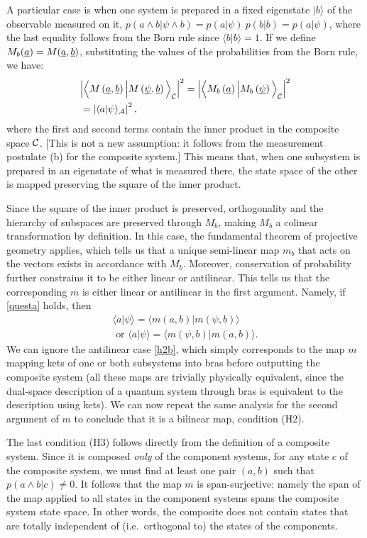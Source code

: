\documentclass[aps,prl,amsmath,amssymb,twocolumn,nofootinbib]{revtex4}
\theoremstyle{plain}
\theoremstyle{definition}
\theoremstyle{remark}
\newcommand{\pj}[1] {\underbar{$#1$}}
\def\>{\rangle}
\def\<{\langle}
\def\labell#1{\label{#1}}
\begin{document}
A particular case is when one system is
prepared in a fixed eigenstate $|b\>$ of the observable measured on it,
$p(a\wedge b|\psi\wedge b)=p(a|\psi)\:p(b|b)=p(a|\psi)$, where the last equality follows from the Born rule since $\<b|b\>=1$. 
  If we define $M_b(\pj{a}) = M(\pj{a},\pj{b})$, substituting the values of the
probabilities from the Born rule, we have:
\begin{align} &\Big|\Big\<M\left(\pj{a},\pj{b}\right)\Big|M\left(\pj{\psi},\pj{b}\right)\Big\>_{\cal C}\Big|^2
  =\Big|\Big\<M_b\left(\pj{a}\right)\Big|M_b\left(\pj{\psi}\right)\Big\>_{\cal C}\Big|^2
\nonumber \\&
=\left|\<a|\psi\>_{\cal A}\right|^2
\labell{questa},
\end{align}
where the first and second terms contain the inner product in the composite
space $\cal C$. [This is not a new assumption: it follows from the
measurement postulate (b) for the composite system.] This means that,
when one subsystem is prepared in an eigenstate of what is measured
there, the state space of the other is mapped preserving the square of
the inner product.

Since the square of the inner product is preserved, orthogonality and
the hierarchy of subspaces are preserved through $M_b$, making $M_b$ a
colinear transformation by definition. In this case, the fundamental
theorem of projective geometry \cite{fun} applies, which tells us that
a unique semi-linear map $m_b$ that acts on the vectors exists in accordance with $M_b$.
Moreover, conservation of probability further constrains it to be
either linear or antilinear. This tells us that the corresponding $m$
is either linear or antilinear in the first argument. Namely, if
\eqref{questa} holds, then
\begin{align}
\<a|\psi\>=\<m(a,b)|m(\psi,b)\>\labell{h2}\;
 \\\mbox{ or }
\<a|\psi\>=\<m(\psi,b)|m(a,b)\> \labell{h2b}.
\end{align}
We can ignore the antilinear case \eqref{h2b}, which simply
corresponds to the map $m$ mapping kets of one or both subsystems into
bras before outputting the composite system (all these maps are
trivially physically equivalent, since the dual-space description of a
quantum system through bras is equivalent to the description using
kets). We can now repeat the same analysis for the second argument of
$m$ to conclude that it is a bilinear map, condition (H2).

The last condition (H3) follows directly from the definition of a
composite system. Since it is composed {\em only} of the component
systems, for any state $c$ of the composite system, we must find at least one pair $(a, b)$ such that $p(a\wedge b | c)\neq 0$. It follows that the map $m$ is span-surjective: namely the
span of the map applied to all states in the component systems spans
the composite system state space. In other words, the composite does
not contain states that are totally independent of (i.e.~orthogonal
to) the states of the components.
\end{document}
